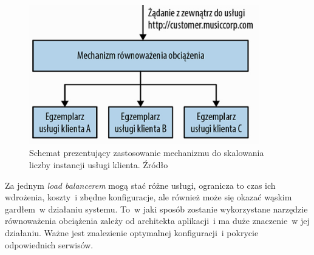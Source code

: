  \begin{figure}[h!]
	\centering
		\includegraphics[width=10cm]{Rysunki/Rozdzial1/rownowazenieObciazenia.png}
		\caption{Schemat prezentujący zastosowanie mechanizmu do skalowania liczby instancji usługi klienta. Źródło \cite{Newman:2016}}	
		\label{fig:rownowaznieObciazenia}
	\end{figure}
	
Za jednym \textit{load balancerem} mogą stać różne usługi, ogranicza to czas ich wdrożenia, koszty~i zbędne konfiguracje, ale również może się okazać wąskim gardłem~w działaniu systemu. To~w jaki sposób zostanie wykorzystane narzędzie równoważenia obciążenia zależy od architekta aplikacji~i ma duże znaczenie~w jej działaniu. Ważne jest znalezienie optymalnej konfiguracji~i pokrycie odpowiednich serwisów.
	